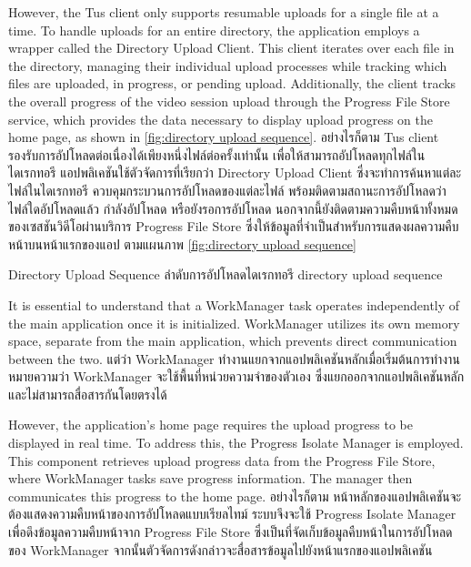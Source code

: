 \ifenglish
However, the Tus client only supports resumable uploads for a single file at a time. To handle uploads for an entire directory, the application employs a wrapper called the Directory Upload Client. This client iterates over each file in the directory, managing their individual upload processes while tracking which files are uploaded, in progress, or pending upload. Additionally, the client tracks the overall progress of the video session upload through the Progress File Store service, which provides the data necessary to display upload progress on the home page, as shown in \autoref{fig:directory upload sequence}.
\else
อย่างไรก็ตาม Tus client รองรับการอัปโหลดต่อเนื่องได้เพียงหนึ่งไฟล์ต่อครั้งเท่านั้น เพื่อให้สามารถอัปโหลดทุกไฟล์ในไดเรกทอรี แอปพลิเคชันใช้ตัวจัดการที่เรียกว่า Directory Upload Client ซึ่งจะทำการค้นหาแต่ละไฟล์ในไดเรกทอรี ควบคุมกระบวนการอัปโหลดของแต่ละไฟล์ พร้อมติดตามสถานะการอัปโหลดว่า ไฟล์ใดอัปโหลดแล้ว กำลังอัปโหลด หรือยังรอการอัปโหลด นอกจากนี้ยังติดตามความคืบหน้าทั้งหมดของเซสชันวิดีโอผ่านบริการ Progress File Store ซึ่งให้ข้อมูลที่จำเป็นสำหรับการแสดงผลความคืบหน้าบนหน้าแรกของแอป ตามแผนภาพ \autoref{fig:directory upload sequence}
\fi

{\ifenglish Directory Upload Sequence \else ลำดับการอัปโหลดไดเรกทอรี \fi}
{directory upload sequence}

\ifenglish
It is essential to understand that a WorkManager task operates independently of the main application once it is initialized. WorkManager utilizes its own memory space, separate from the main application, which prevents direct communication between the two.
\else
แต่ว่า WorkManager ทำงานแยกจากแอปพลิเคชันหลักเมื่อเริ่มต้นการทำงาน หมายความว่า WorkManager จะใช้พื้นที่หน่วยความจำของตัวเอง ซึ่งแยกออกจากแอปพลิเคชันหลัก และไม่สามารถสื่อสารกันโดยตรงได้
\fi

\ifenglish
However, the application's home page requires the upload progress to be displayed in real time. To address this, the Progress Isolate Manager is employed. This component retrieves upload progress data from the Progress File Store, where WorkManager tasks save progress information. The manager then communicates this progress to the home page.
\else
อย่างไรก็ตาม หน้าหลักของแอปพลิเคชันจะต้องแสดงความคืบหน้าของการอัปโหลดแบบเรียลไทม์ ระบบจึงจะใช้ Progress Isolate Manager เพื่อดึงข้อมูลความคืบหน้าจาก Progress File Store ซึ่งเป็นที่จัดเก็บข้อมูลคืบหน้าในการอัปโหลดของ WorkManager จากนั้นตัวจัดการดังกล่าวจะสื่อสารข้อมูลไปยังหน้าแรกของแอปพลิเคชัน
\fi


